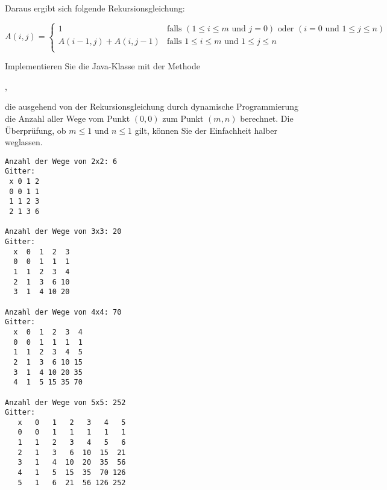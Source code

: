 \documentclass{bschlangaul-aufgabe}
\begin{document}
\noindent
Daraus ergibt sich folgende Rekursionsgleichung:

\begin{equation*}
A(i, j) =
\begin{cases}
1 &
\text{falls }
(1 \leq i \leq m \text{ und } j = 0) \text{ oder }
(i = 0 \text{ und } 1 \leq j \leq n) \\

A(i - 1, j) + A(i, j - 1) &
\text{falls }
1 \leq i \leq m \text{ und }
1 \leq j \leq n \\
\end{cases}
\end{equation*}

\noindent
Implementieren Sie die Java-Klasse  mit der Methode

\begin{center}
,
\end{center}

\noindent
die ausgehend von der Rekursionsgleichung durch dynamische
Programmierung die Anzahl aller Wege vom Punkt $(0, 0)$ zum Punkt $(m,
n)$ berechnet.
Die Überprüfung, ob $m \leq 1$ und $n \leq 1$ gilt, können Sie der
Einfachheit halber weglassen.

\begin{bAntwort}
\end{bAntwort}

\begin{bAdditum}

%


\begin{verbatim}
Anzahl der Wege von 2x2: 6
Gitter:
 x 0 1 2
 0 0 1 1
 1 1 2 3
 2 1 3 6

Anzahl der Wege von 3x3: 20
Gitter:
  x  0  1  2  3
  0  0  1  1  1
  1  1  2  3  4
  2  1  3  6 10
  3  1  4 10 20

Anzahl der Wege von 4x4: 70
Gitter:
  x  0  1  2  3  4
  0  0  1  1  1  1
  1  1  2  3  4  5
  2  1  3  6 10 15
  3  1  4 10 20 35
  4  1  5 15 35 70

Anzahl der Wege von 5x5: 252
Gitter:
   x   0   1   2   3   4   5
   0   0   1   1   1   1   1
   1   1   2   3   4   5   6
   2   1   3   6  10  15  21
   3   1   4  10  20  35  56
   4   1   5  15  35  70 126
   5   1   6  21  56 126 252
\end{verbatim}

%


\end{bAdditum}
\end{document}
